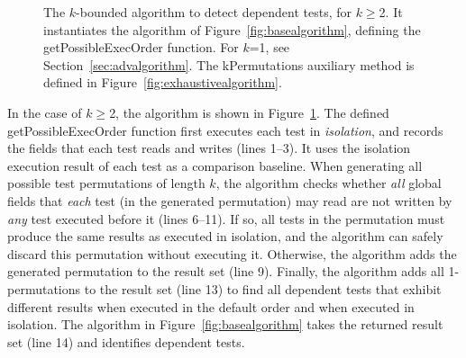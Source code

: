 \begin{figure}[t]
\vspace{-3mm}
\caption {The \dependenceaware{} $k$-bounded algorithm to detect dependent tests,
  for $k$$\ge$2.
It instantiates the algorithm of Figure~\ref{fig:basealgorithm}, defining the
getPossibleExecOrder function.
For $k$=1, see Section~\ref{sec:advalgorithm}.
The kPermutations auxiliary method is defined in Figure~\ref{fig:exhaustivealgorithm}.
} 
\label{fig:impralg}
\end{figure}

In the case of $k$$\ge$2, the algorithm
is shown in Figure~\ref{fig:impralg}.
%
The defined getPossibleExecOrder function first executes
each test in \textit{isolation}, and records the
fields that each test reads and writes (lines 1--3).
It uses the isolation execution result
of each test as a comparison baseline.
When generating all possible test permutations
of length $k$, the algorithm checks whether
\textit{all} global fields that \textit{each} test (in the generated permutation)
may read are not written by \textit{any} test executed before it (lines 6--11).
If so, all tests in the permutation
must produce the same results as executed in isolation,
and the algorithm can safely discard this permutation without
executing it. Otherwise, the algorithm adds the generated
permutation to the result set (line 9).
Finally, the algorithm adds all 1-permutations to
the result set (line 13)
to find all dependent tests that exhibit different results
when executed in the default order and when executed in isolation.
The algorithm in Figure~\ref{fig:basealgorithm} takes the
returned result set (line 14) and identifies dependent tests. %

